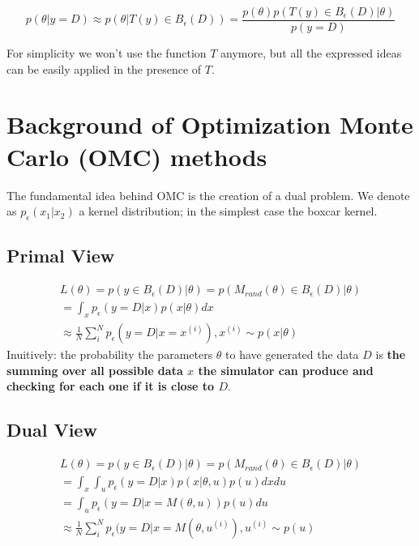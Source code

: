 \documentclass{article}
\begin{document}
\begin{equation} \label{eq:summary_stat}
    p(\theta|y=D) \approx p(\theta|T(y) \in B_\epsilon(D)) = \frac{p(\theta) p(T(y) \in B_\epsilon(D)|\theta)}{p(y=D)}
\end{equation}

For simplicity we won't use the function $T$ anymore, but all the expressed ideas can be easily applied in the presence of $T$.


\section{Background of Optimization Monte Carlo (OMC) methods}\label{sec:background-of-omc}

The fundamental idea behind OMC is the creation of a dual problem.
We denote as $p_\epsilon(x_1|x_2)$ a kernel distribution; in the simplest case the boxcar kernel.

\subsection*{Primal View}

\begin{gather} \label{eq:primal_view}
  L(\theta) = p(y \in B_\epsilon (D)|\theta) = p(M_{rand}(\theta) \in B_\epsilon (D)|\theta)\\
  = \int_x p_\epsilon(y=D|x)p(x|\theta)dx \\
  \approx \frac{1}{N} \sum_i^N p_\epsilon (y=D|x=x^{(i)}), x^{(i)} \sim p(x|\theta)
\end{gather}
%
Inuitively: the probability the parameters $\theta$ to have generated the data $D$ is \textbf{the summing over all possible data $x$ the simulator can produce and checking for each one if it is close to $D$}.

\subsection*{Dual View}

\begin{gather} \label{eq:dual_view}
  L(\theta) = p(y \in B_\epsilon (D)|\theta) = p(M_{rand}(\theta) \in B_\epsilon (D)|\theta)\\
  = \int_x \int_u p_\epsilon(y=D|x)p(x|\theta, u) p(u)dxdu \\
  = \int_u p_\epsilon(y=D|x=M(\theta, u)) p(u)du \\
  \approx \frac{1}{N} \sum_i^N p_\epsilon (y=D|x=M(\theta, u^{(i)}), u^{(i)} \sim p(u)
\end{gather}
\end{document}
